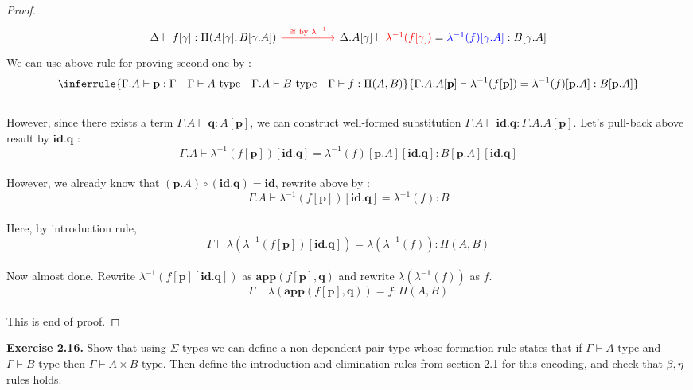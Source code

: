\documentclass[12pt, letterpaper]{amsart}
\theoremstyle{definition}
\theoremstyle{remark}
\theoremstyle{plain}
\numberwithin{equation}{section}
\begin{document}
\begin{proof}
\[\begin{tikzcd}[row sep = huge, column sep = huge]
    \Delta \vdash f[\gamma] : \Pi(A[\gamma], B[\gamma.A]) \arrow[red, r, "\cong \text{  by  } \lambda^{-1}"] & \Delta.A[\gamma] \vdash \textcolor{red}{\lambda^{-1}(f[\gamma])} = \textcolor{blue}{\lambda^{-1}(f)[\gamma.A]} : B[\gamma.A]
\end{tikzcd}
\]
We can use above rule for proving second one by :
\[
\inferrule
{
    \Gamma.A \vdash \mathbf{p} : \Gamma \quad \Gamma \vdash A \text{ type} \quad \Gamma.A \vdash B \text{ type} \quad \Gamma \vdash f : \Pi(A, B)
}
{
    \Gamma.A.A[\mathbf{p}] \vdash \lambda^{-1}(f[\mathbf{p}]) = \lambda^{-1}(f)[\mathbf{p}.A] : B[\mathbf{p}.A]
}
\]
\\
However, since there exists a term $\Gamma.A \vdash \mathbf{q} : A[\mathbf{p}]$, we can construct well-formed substitution $\Gamma.A \vdash \mathbf{id}.\mathbf{q} : \Gamma.A.A[\mathbf{p}]$. 
Let's pull-back above result by $\mathbf{id}.\mathbf{q}$ : 
\[\Gamma.A \vdash \lambda^{-1}(f[\mathbf{p}])[\mathbf{id}.\mathbf{q}] = \lambda^{-1}(f)[\mathbf{p}.A][\mathbf{id}.\mathbf{q}] : B[\mathbf{p}.A][\mathbf{id}.\mathbf{q}]\]
\\
However, we already know that $(\mathbf{p}.A) \circ (\mathbf{id}.\mathbf{q}) = \mathbf{id}$, rewrite above by : 
\[\Gamma.A \vdash \lambda^{-1}(f[\mathbf{p}])[\mathbf{id}.\mathbf{q}] = \lambda^{-1}(f) : B\]
\\
Here, by introduction rule, 
\[\Gamma \vdash \lambda(\lambda^{-1}(f[\mathbf{p}])[\mathbf{id}.\mathbf{q}]) = \lambda(\lambda^{-1}(f)) : \Pi(A, B)\]
\\
Now almost done. Rewrite $\lambda^{-1}(f[\mathbf{p}][\mathbf{id}.\mathbf{q}])$ as $\mathbf{app}(f[\mathbf{p}], \mathbf{q})$ and rewrite $\lambda(\lambda^{-1}(f))$ as $f$. 
\[\Gamma \vdash \lambda(\mathbf{app}(f[\mathbf{p}], \mathbf{q})) = f : \Pi(A, B)\]
\\
This is end of proof. 
\end{proof}

\newpage

\textbf{Exercise 2.16.} Show that using $\Sigma$ types we can define a non-dependent pair type 
whose formation rule states that if $\Gamma \vdash A \text{ type}$ and $\Gamma \vdash B \text{ type}$ then 
$\Gamma \vdash A \times B \text{ type}$. Then define the introduction and 
elimination rules from section 2.1 for this encoding, and check that $\beta, \eta$-rules holds. 
\end{document}

